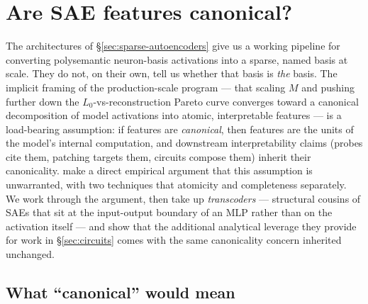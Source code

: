 
\section{Are SAE features canonical?}
\label{sec:sae-canonicality}
\label{sec:sae-canonical}

The architectures of \S\ref{sec:sparse-autoencoders} give us a working
pipeline for converting polysemantic neuron-basis activations into a
sparse, named  basis at scale. They do not, on their own, tell
us whether that basis is \emph{the} basis. The implicit framing of the
production-scale  program --- that scaling $M$ and pushing further
down the $L_0$-vs-reconstruction Pareto curve converges toward a
canonical decomposition of model activations into atomic, interpretable
features --- is a load-bearing assumption: if features are
\emph{canonical}, then  features are the units of the model's
internal computation, and downstream interpretability claims (probes
cite them, patching targets them, circuits compose them) inherit
their canonicality. \citet{leask2025-sae-not-canonical} make a direct
empirical argument that this assumption is unwarranted, with two
techniques that  atomicity and completeness separately. We work
through the argument, then take up \emph{transcoders}
\citep{dunefsky2024-transcoders} --- structural cousins of SAEs that
sit at the input-output boundary of an MLP rather than on the
activation itself --- and show that the additional analytical leverage
they provide for  work in \S\ref{sec:circuits} comes with the
same canonicality concern inherited unchanged.

\subsection{What ``canonical'' would mean}
\label{sec:canonical-definition}

